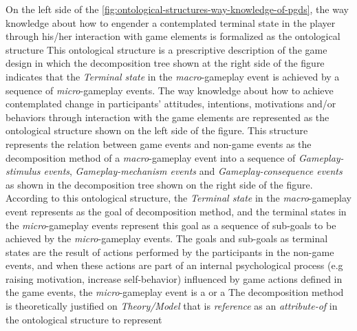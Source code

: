 On the left side of the \autoref{fig:ontological-structures-way-knowledge-of-pgds}, the way knowledge about how to engender a contemplated terminal state in the player through his/her interaction with game elements is formalized as the ontological structure 
This ontological structure is a prescriptive description of the game design in which the decomposition tree shown at the right side of the figure indicates that the \emph{Terminal state} in the \emph{macro}-gameplay event is achieved by a sequence of \emph{micro}-gameplay events.
The way knowledge about how to achieve contemplated change in participants' attitudes, intentions, motivations and/or behaviors through interaction with the game elements are represented as the ontological structure  shown on the left side of the figure. 
This structure represents the relation between game events and non-game events as the decomposition method of a \emph{macro}-gameplay event into a sequence of \emph{Gameplay-stimulus events}, \emph{Gameplay-mechanism events} and \emph{Gameplay-consequence events} as shown in the decomposition tree shown on the right side of the figure.
According to this ontological structure, the \emph{Terminal state} in the \emph{macro}-gameplay event represents  as the goal of decomposition method, and the terminal states in the \emph{micro}-gameplay events represent  this goal as a sequence of sub-goals to be achieved by the \emph{micro}-gameplay events.
The goals and sub-goals as terminal states are the result of actions performed by the participants in the non-game events, and when these actions are part of an internal psychological process (e.g raising motivation, increase self-behavior) influenced by game actions defined in the game events, the \emph{micro}-gameplay event is a  or a 
The decomposition method is theoretically justified on \emph{Theory/Model} that is \emph{reference} as an \emph{attribute-of} in the ontological structure to represent 

